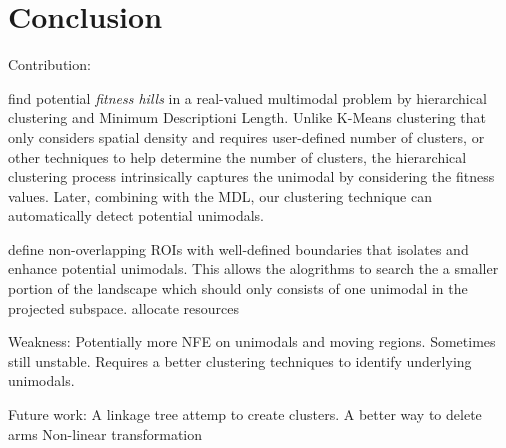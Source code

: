 \chapter{Conclusion}
\label{chapter:conclusion}


Contribution:

find potential \textit{fitness hills} in a real-valued multimodal problem by hierarchical clustering and Minimum Descriptioni Length.
Unlike K-Means clustering that only considers spatial density and requires user-defined number of clusters, or other techniques to help determine the number of clusters, 
the hierarchical clustering process intrinsically captures the unimodal by considering the fitness values.
Later, combining with the MDL, our clustering technique can automatically detect potential unimodals.

define non-overlapping ROIs with well-defined boundaries that isolates and enhance potential unimodals.
This allows the alogrithms to search the a smaller portion of the landscape which should only consists of one unimodal in the projected subspace.
allocate resources

Weakness:
Potentially more NFE on unimodals and moving regions.
Sometimes still unstable.
Requires a better clustering techniques to identify underlying unimodals.


Future work:
A linkage tree attemp to create clusters.
A better way to delete arms
Non-linear transformation




